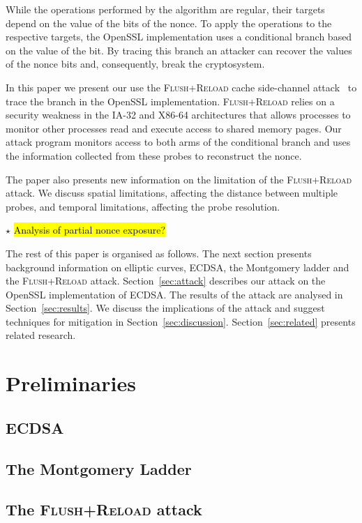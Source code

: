 \documentclass{llncs}
\newcommand{\starpar}[1]{\par{\footnotesize $\star$ \hl{#1}\par}}
\begin{document}
While the operations performed by the algorithm are regular, their targets depend on the value of the bits of the nonce.
To apply the operations to the respective targets, the OpenSSL implementation uses a conditional branch based on the value of the bit.
By tracing this branch an attacker can recover the values of the nonce bits and, consequently, break the cryptosystem.

In this paper we present our 
use the \textsc{Flush+Reload} cache side-channel attack~\cite{yarom13flush}
to trace the branch in the OpenSSL implementation.
\textsc{Flush+Reload} relies on a security weakness in the IA-32 and X86-64 architectures that allows processes
to monitor other processes read and execute access to shared memory pages.
Our attack program monitors access to both arms of the conditional branch and uses the information
collected from these probes to reconstruct the nonce.

The paper also presents new information on the limitation of the \textsc{Flush+Reload} attack.
We discuss spatial limitations, affecting the distance between multiple probes, and 
temporal limitations, affecting the probe resolution.

\starpar{Analysis of partial nonce exposure?}

The rest of this paper is organised as follows.
The next section presents background information on elliptic curves, ECDSA, the Montgomery ladder and the \textsc{Flush+Reload} attack.
Section~\ref{sec:attack} describes our attack on the OpenSSL implementation of ECDSA.
The results of the attack are analysed in Section~\ref{sec:results}.
We discuss the implications of the attack and suggest techniques for mitigation in Section~\ref{sec:discussion}.
Section~\ref{sec:related} presents related research.
\section{Preliminaries}\label{sec:background}
\subsection{ECDSA}
\subsection{The Montgomery Ladder}
\subsection{The \textsc{Flush+Reload} attack}
\end{document}
